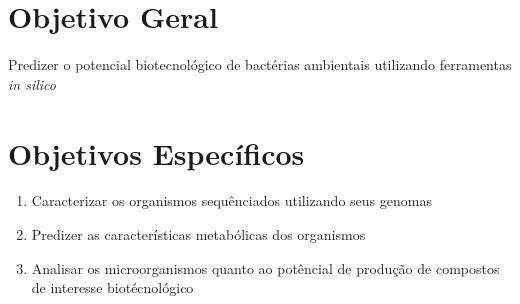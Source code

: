\section{Objetivo Geral}

Predizer o potencial biotecnológico de bactérias ambientais utilizando 
ferramentas \textit{in silico} 

\section{Objetivos Específicos}
\begin{enumerate}
    \item Caracterizar os organismos sequênciados utilizando seus genomas
    \item Predizer as características metabólicas dos organismos
    \item Analisar os microorganismos quanto ao potêncial de produção de compostos de interesse biotécnológico
\end{enumerate}





